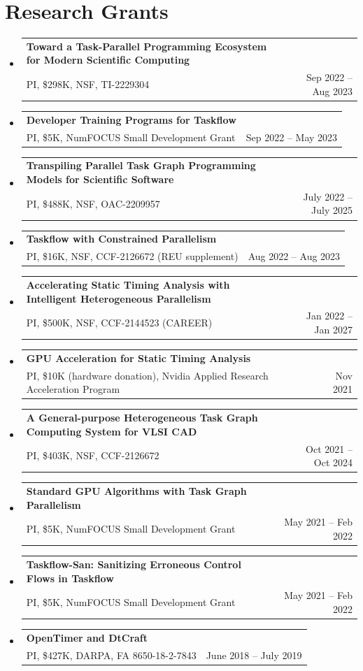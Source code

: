 \documentclass[A4,11pt]{article}
\makeatletter
\newcommand{\CVItem}[1]{
  \item\small{
    {#1 \vspace{-2pt}}
  }
}
\newcommand{\CVSubheading}[4]{
  \vspace{-2pt}\item
    \begin{tabular*}{0.97\textwidth}[t]{l@{\extracolsep{\fill}}r}
      \textbf{#1} & #2 \\
      \small#3 & \small #4 \\
    \end{tabular*}\vspace{-7pt}
}
\newcommand{\CVSubHeadingListStart}{\begin{itemize}[leftmargin=0.5cm, label={}]}
\newcommand{\CVSubHeadingListEnd}{\end{itemize}}
\newcommand{\CVItemListStart}{\begin{itemize}}
\newcommand{\CVItemListEnd}{\end{itemize}\vspace{-5pt}}
\makeatother
\begin{document}
\section{Research Grants}
  \CVSubHeadingListStart
    \CVSubheading
      {{Toward a Task-Parallel Programming Ecosystem for Modern Scientific Computing}}{}
      {PI, \$298K, NSF, TI-2229304}{Sep 2022 -- Aug 2023}
    \CVSubheading
      {{Developer Training Programs for Taskflow}}{}
      {PI, \$5K, NumFOCUS Small Development Grant}{Sep 2022 -- May 2023}
    \CVSubheading
      {{Transpiling Parallel Task Graph Programming Models for Scientific Software}}{}
      {PI, \$488K, NSF, OAC-2209957}{July 2022 -- July 2025}
    \CVSubheading
      {{Taskflow with Constrained Parallelism}}{}
      {PI, \$16K, NSF, CCF-2126672 (REU supplement)}{Aug 2022 -- Aug 2023}
    \CVSubheading
      {{Accelerating Static Timing Analysis with Intelligent Heterogeneous Parallelism}}{}
      {PI, \$500K, NSF, CCF-2144523 (CAREER)}{Jan 2022 -- Jan 2027}
    \CVSubheading
      {{GPU Acceleration for Static Timing Analysis}}{}
      {PI, \$10K (hardware donation), Nvidia Applied Research Acceleration Program}{Nov 2021}
    \CVSubheading
      {{A General-purpose Heterogeneous Task Graph Computing System for VLSI CAD}}{}
      {PI, \$403K, NSF, CCF-2126672}{Oct 2021 -- Oct 2024}
    \CVSubheading
      {{Standard GPU Algorithms with Task Graph Parallelism}}{}
      {PI, \$5K, NumFOCUS Small Development Grant}{May 2021 -- Feb 2022}
    \CVSubheading
      {{Taskflow-San: Sanitizing Erroneous Control Flows in Taskflow}}{}
      {PI, \$5K, NumFOCUS Small Development Grant}{May 2021 -- Feb 2022}
    \CVSubheading
      {{OpenTimer and DtCraft}}{}
      {PI, \$427K, DARPA, FA 8650-18-2-7843}{June 2018 -- July 2019}
  \CVSubHeadingListEnd

\end{document}
